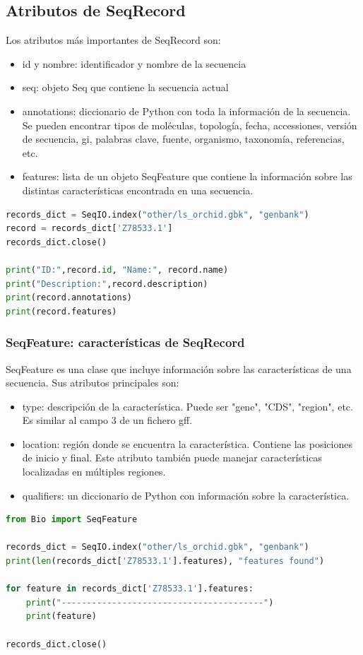 \subsection{Atributos de SeqRecord}
Los atributos más importantes de SeqRecord son:
\begin{itemize}
\item id y nombre: identificador y nombre de la secuencia
\item seq: objeto Seq que contiene la secuencia actual
\item annotations: diccionario de Python con toda la información de la secuencia. Se pueden encontrar tipos de moléculas, topología, fecha, accessiones, versión de secuencia, gi, palabras clave, fuente, organismo, taxonomía, referencias, etc.
\item features: lista de un objeto SeqFeature que contiene la información sobre las distintas características encontrada en una secuencia.
\end{itemize}
\begin{lstlisting}[language=Python]
records_dict = SeqIO.index("other/ls_orchid.gbk", "genbank")
record = records_dict['Z78533.1']
records_dict.close()

print("ID:",record.id, "Name:", record.name)
print("Description:",record.description)
print(record.annotations)
print(record.features)
\end{lstlisting}

\subsubsection{SeqFeature: características de SeqRecord}
SeqFeature es una clase que incluye información sobre las características de una secuencia. Sus atributos principales son:
\begin{itemize}
\item type: descripción de la característica. Puede ser "gene", "CDS", "region", etc. Es similar al campo 3 de un fichero gff.
\item location: región donde se encuentra la característica. Contiene las posiciones de inicio y final. Este atributo también puede manejar características localizadas en múltiples regiones.
\item qualifiers: un diccionario de Python con información sobre la característica.
\end{itemize}
\begin{lstlisting}[language=Python]
from Bio import SeqFeature

records_dict = SeqIO.index("other/ls_orchid.gbk", "genbank")
print(len(records_dict['Z78533.1'].features), "features found")

for feature in records_dict['Z78533.1'].features:
    print("----------------------------------------")
    print(feature)
    
records_dict.close()
\end{lstlisting}

